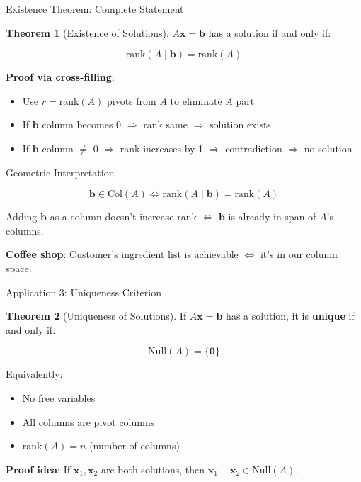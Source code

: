 \documentclass[10pt]{beamer}
\theoremstyle{definition}
\newtheorem{thm}{Theorem}[section]
\newcommand{\x}[1]{\alert{\textbf{#1}}}
\begin{document}
\begin{frame}{Existence Theorem: Complete Statement}

\begin{thm}[Existence of Solutions]
$A\mathbf{x} = \mathbf{b}$ has a solution if and only if:

$$\text{rank}(A \mid \mathbf{b}) = \text{rank}(A)$$
\end{thm}

\vspace{1em}

\x{Proof via cross-filling}:

\begin{itemize}
\item Use $r = \text{rank}(A)$ pivots from $A$ to eliminate $A$ part
\item If $\mathbf{b}$ column becomes 0 $\Rightarrow$ rank same $\Rightarrow$ solution exists
\item If $\mathbf{b}$ column $\neq$ 0 $\Rightarrow$ rank increases by 1 $\Rightarrow$ contradiction $\Rightarrow$ no solution
\end{itemize}

\end{frame}

\begin{frame}{Geometric Interpretation}

$$\mathbf{b} \in \text{Col}(A) \iff \text{rank}(A \mid \mathbf{b}) = \text{rank}(A)$$

\vspace{1em}

Adding $\mathbf{b}$ as a column doesn't increase rank $\iff$ $\mathbf{b}$ is already in span of $A$'s columns.

\vspace{1em}

\x{Coffee shop}: Customer's ingredient list is achievable $\iff$ it's in our column space.

\end{frame}

\begin{frame}{Application 3: Uniqueness Criterion}

\begin{thm}[Uniqueness of Solutions]
If $A\mathbf{x} = \mathbf{b}$ has a solution, it is \textbf{unique} if and only if:

$$\text{Null}(A) = \{\mathbf{0}\}$$

Equivalently:
\begin{itemize}
\item No free variables
\item All columns are pivot columns
\item $\text{rank}(A) = n$ (number of columns)
\end{itemize}
\end{thm}

\vspace{0.5em}

\x{Proof idea}: If $\mathbf{x}_1, \mathbf{x}_2$ are both solutions, then $\mathbf{x}_1 - \mathbf{x}_2 \in \text{Null}(A)$.

\end{frame}
\end{document}
